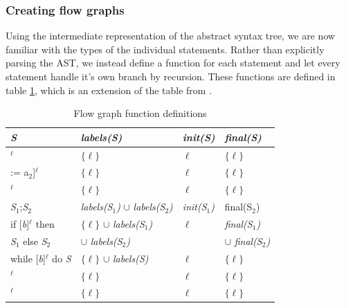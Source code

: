 \subsubsection{Creating flow graphs}\label{section:CreatingFlowGraphs}
Using the intermediate representation of the abstract syntax tree, we are now familiar with the types of the individual statements. Rather than explicitly parsing the AST, we instead define a function for each statement and let every statement handle it's own branch by recursion. These functions are defined in table \ref{table:flow_graph_functions}, which is an extension of the table from \cite{02242_slides}.

\begin{table}
\begin{tabular}{| l | l | l | l |}
\hline	
\textsl{S}                              & \textsl{labels(S)}                                    & \textsl{init(S)}     & \textsl{final(S)} \\ 
\hline
[x := a]$^\ell$                         & $\{\ell\}$                                            &$\ell$                & $\{\ell\}$ \\
\hline
[int A[a$_1$] := a$_2$]$^\ell$          & $\{\ell\}$                                            &$\ell$                & $\{\ell\}$ \\
\hline
[skip]$^\ell$                           & $\{\ell\}$                                            &$\ell$                & $\{\ell\}$ \\
\hline
\textsl{S}$_1$;\textsl{S}$_2$           & \textsl{labels(S$_1$)} $\cup$ \textsl{labels(S$_2$)}  & \textsl{init(S$_1$)} & {final(S$_2$)} \\ %
\hline
if [\textsl{b}]$^\ell$ then             & $\{\ell\}$ $\cup$  \textsl{labels(S$_1$)}             &$\ell$                & \textsl{final(S$_1$)} \\
  \textsl{S}$_1$ else \textsl{S}$_2$    &  $\cup$ \textsl{labels(S$_2$)}                        &                      & $\cup$ \textsl{final(S$_2$)} \\
\hline
while [\textsl{b}]$^\ell$ do \textsl{S} & $\{\ell\}$ $\cup$  \textsl{labels(S)}                 &$\ell$                & $\{\ell\}$ \\
\hline
[read \textsl{x}]$^\ell$                & $\{\ell\}$                                            &$\ell$                & $\{\ell\}$ \\
\hline
[write \textsl{x}]$^\ell$               & $\{\ell\}$                                            &$\ell$                & $\{\ell\}$ \\
\hline
\end{tabular}
\centering
\caption{Flow graph function definitions}
\label{table:flow_graph_functions}
\end{table}


